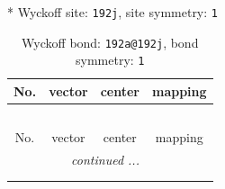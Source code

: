 \documentclass[fleqn,8pt]{jsarticle}
\begin{document}
* Wyckoff site: {\tt 192j}, site symmetry: {\tt 1}
\renewcommand{\arraystretch}{1.2}
\begin{longtable}{cccc}
\caption{Wyckoff bond: {\tt 192a@192j}, bond symmetry: {\tt 1}}
 \\
 \hline \hline
No. & vector & center & mapping \\ \hline \endfirsthead

\multicolumn{3}{l}{\tablename\ \thetable{}} \\
 \hline \hline
No. & vector & center & mapping \\ \hline \endhead

 \hline \hline
\multicolumn{3}{r}{\footnotesize\it continued ...} \\ \endfoot

 \hline \hline
\multicolumn{3}{r}{} \\ \endlastfoot


\end{longtable}
\end{document}
